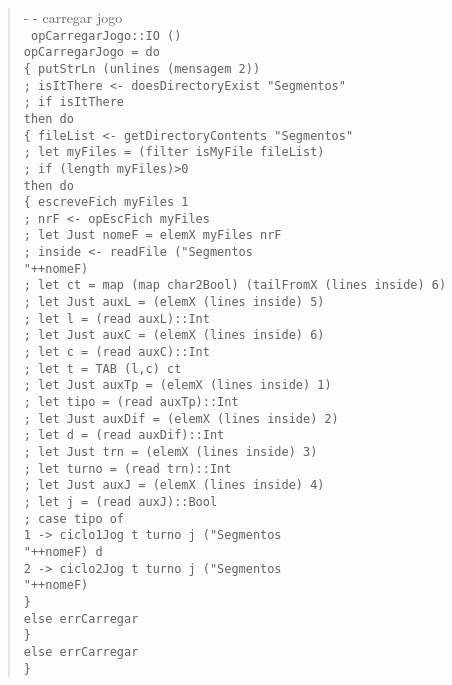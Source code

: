 \documentclass[a4paper,titlepage]{scrreprt}
\begin{document}
	\begin{quote}
		{\small - - carregar jogo\\}
		{\tt
		opCarregarJogo::IO ()\\
		opCarregarJogo = do\\
		\{ putStrLn (unlines (mensagem 2))\\
		; isItThere <- doesDirectoryExist "Segmentos"\\
		; if isItThere\\
		then do\\
		\{ fileList <- getDirectoryContents "Segmentos"\\
		; let myFiles = (filter isMyFile fileList)\\
		; if (length myFiles)>0\\
		then do\\
		\{ escreveFich myFiles 1\\
		; nrF <- opEscFich myFiles\\
		; let Just nomeF = elemX myFiles nrF\\
		; inside <- readFile ("Segmentos\\"++nomeF)\\
		; let ct = map (map char2Bool) (tailFromX (lines inside) 6)\\
		; let Just auxL = (elemX (lines inside) 5)\\
		; let l = (read auxL)::Int\\
		; let Just auxC = (elemX (lines inside) 6)\\
		; let c = (read auxC)::Int\\
		; let t = TAB (l,c) ct\\
		; let Just auxTp = (elemX (lines inside) 1)\\
		; let tipo = (read auxTp)::Int\\
		; let Just auxDif = (elemX (lines inside) 2)\\
		; let d = (read auxDif)::Int\\
		; let Just trn = (elemX (lines inside) 3)\\
		; let turno = (read trn)::Int\\
		; let Just auxJ = (elemX (lines inside) 4)\\
		; let j = (read auxJ)::Bool\\
		; case tipo of\\
		1 -> ciclo1Jog t turno j ("Segmentos\\"++nomeF) d\\
		2 -> ciclo2Jog t turno j ("Segmentos\\"++nomeF)\\
		\}\\
		else errCarregar\\
		\}\\
		else errCarregar\\
		\}
		}
	\end{quote}
\end{document}
